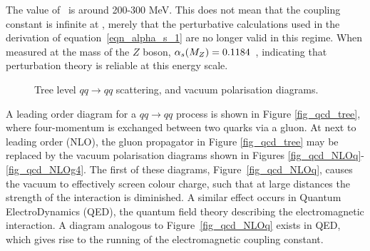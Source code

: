 The value of \lqcd~is around 200-300 MeV. This does not mean that the coupling constant is infinite at \lqcd, merely that the perturbative calculations used in the derivation of equation~\ref{eqn_alpha_s_1} are no longer valid in this regime. When measured at the mass of the $Z$ boson,  $\alpha_s (M_Z) =0.1184$~\cite{reviewPP2012}, indicating that perturbation theory is reliable at this energy scale. 
\begin{figure}[h]
\begin{center}

\caption[Tree level $qq\rightarrow qq$ scattering]{Tree level $qq\rightarrow  qq$ scattering, and vacuum polarisation diagrams. }
\label{qcd_LO_NLO}
\end{center}
\end{figure}

A leading order diagram for a $qq \rightarrow qq$ process is shown in Figure \ref{fig_qcd_tree}, where four-momentum is exchanged between two quarks via a gluon. At next to leading order (NLO), the gluon propagator in Figure \ref{fig_qcd_tree} may be replaced by the vacuum polarisation diagrams shown in Figures \ref{fig_qcd_NLOq}-\ref{fig_qcd_NLOg4}. The first of these diagrams, Figure~\ref{fig_qcd_NLOq}, causes the vacuum to effectively screen colour charge, such that at large distances the strength of the interaction is diminished. A similar effect occurs in Quantum ElectroDynamics (QED), the quantum field theory describing the electromagnetic interaction. A diagram analogous to Figure~\ref{fig_qcd_NLOq} exists in QED, which gives rise to the running of the electromagnetic coupling constant.%


